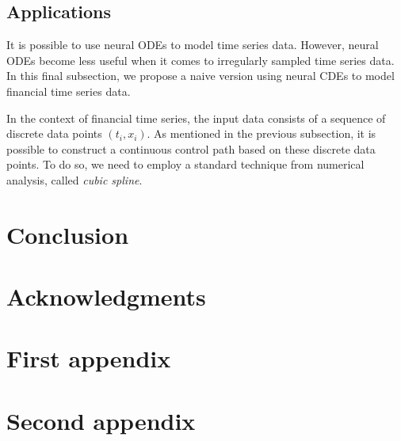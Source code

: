 \documentclass[a4paper,11pt,titlepage]{article}
\theoremstyle{definition}
\theoremstyle{plain}
\theoremstyle{remark}
\begin{document}
\subsection{Applications}

It is possible to use neural ODEs to model time series data. However, neural ODEs become less useful when it comes to irregularly sampled time series data. In this final subsection, we propose a naive version using neural CDEs to model financial time series data.

In the context of financial time series, the input data consists of a sequence of discrete data points $(t_i,x_i)$. As mentioned in the previous subsection, it is possible to construct a continuous control path based on these discrete data points. To do so, we need to employ a standard technique from numerical analysis, called \textit{cubic spline}.


\pagebreak
\section{Conclusion}

\section*{Acknowledgments}

\appendix

\pagebreak
\section{First appendix}

\pagebreak
\section{Second appendix}

\pagebreak

\end{document}
